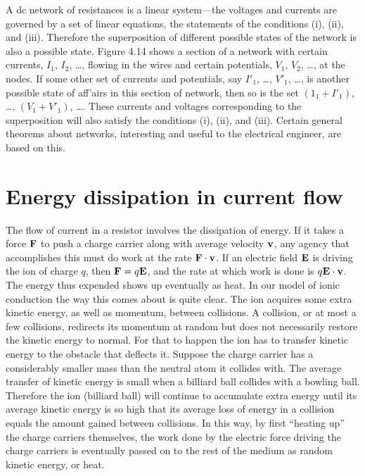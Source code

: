 A dc network of resistances is a linear system---the voltages and
currents are governed by a set of linear equations, the statements of
the conditions (i), (ii), and (iii). Therefore the superposition of
different possible states of the network is also a possible state. 
Figure 4.14 shows a section of a network with certain currents, $I_1$,
$I_2$, \ldots, flowing in the wires and certain potentials, $V_1$, $V_2$, \ldots, at
the nodes. If some other set of currents and potentials, say $I'_1$, \ldots,
$V'_1$, \ldots, is another possible state of aff'airs in this section of network,
then so is the set $(1_1 + I'_1)$, \ldots, $(V_1 + V'_1)$, \ldots. These currents
and voltages corresponding to the superposition will also satisfy the
conditions (i), (ii), and (iii). Certain general theorems about 
networks, interesting and useful to the electrical engineer, are based
on this.

\section{Energy dissipation in current flow}

The flow of current in a resistor involves the dissipation of energy.
If it takes a force $\mathbf{F}$ to push a charge carrier along with average
velocity $\mathbf{v}$, any agency that accomplishes this must do work at the
rate $\mathbf{F}\cdot\mathbf{v}$. If an electric field $\mathbf{E}$ is driving the ion of charge $q$, then
$\mathbf{F} = q\mathbf{E}$, and the rate at which work is done is $q\mathbf{E}\cdot\mathbf{v}$. The energy
thus expended shows up eventually as heat. In our model of ionic
conduction the way this comes about is quite clear. The ion acquires
some extra kinetic energy, as well as momentum, between collisions.
A collision, or at most a few collisions, redirects its momentum at
random but does not necessarily restore the kinetic energy to normal.
For that to happen the ion has to transfer kinetic energy to the obstacle
that deflects it. Suppose the charge carrier has a considerably
smaller mass than the neutral atom it collides with. The average
transfer of kinetic energy is small when a billiard ball collides with
a bowling ball. Therefore the ion (billiard ball) will continue to
accumulate extra energy until its average kinetic energy is so high
that its average loss of energy in a collision equals the amount gained
between collisions. In this way, by first ``heating up'' the charge
carriers themselves, the work done by the electric force driving the
charge carriers is eventually passed on to the rest of the medium as
random kinetic energy, or heat.

